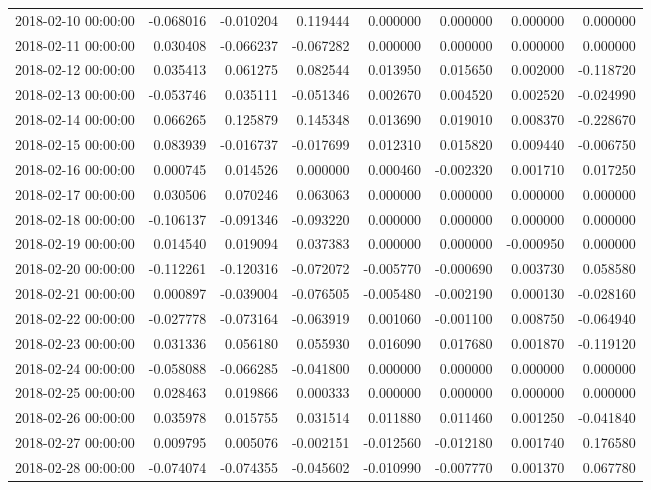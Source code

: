 \begin{tabular}{lrrrrrrr}
2018-02-10 00:00:00 & -0.068016 & -0.010204 & 0.119444 & 0.000000 & 0.000000 & 0.000000 & 0.000000 \\
2018-02-11 00:00:00 & 0.030408 & -0.066237 & -0.067282 & 0.000000 & 0.000000 & 0.000000 & 0.000000 \\
2018-02-12 00:00:00 & 0.035413 & 0.061275 & 0.082544 & 0.013950 & 0.015650 & 0.002000 & -0.118720 \\
2018-02-13 00:00:00 & -0.053746 & 0.035111 & -0.051346 & 0.002670 & 0.004520 & 0.002520 & -0.024990 \\
2018-02-14 00:00:00 & 0.066265 & 0.125879 & 0.145348 & 0.013690 & 0.019010 & 0.008370 & -0.228670 \\
2018-02-15 00:00:00 & 0.083939 & -0.016737 & -0.017699 & 0.012310 & 0.015820 & 0.009440 & -0.006750 \\
2018-02-16 00:00:00 & 0.000745 & 0.014526 & 0.000000 & 0.000460 & -0.002320 & 0.001710 & 0.017250 \\
2018-02-17 00:00:00 & 0.030506 & 0.070246 & 0.063063 & 0.000000 & 0.000000 & 0.000000 & 0.000000 \\
2018-02-18 00:00:00 & -0.106137 & -0.091346 & -0.093220 & 0.000000 & 0.000000 & 0.000000 & 0.000000 \\
2018-02-19 00:00:00 & 0.014540 & 0.019094 & 0.037383 & 0.000000 & 0.000000 & -0.000950 & 0.000000 \\
2018-02-20 00:00:00 & -0.112261 & -0.120316 & -0.072072 & -0.005770 & -0.000690 & 0.003730 & 0.058580 \\
2018-02-21 00:00:00 & 0.000897 & -0.039004 & -0.076505 & -0.005480 & -0.002190 & 0.000130 & -0.028160 \\
2018-02-22 00:00:00 & -0.027778 & -0.073164 & -0.063919 & 0.001060 & -0.001100 & 0.008750 & -0.064940 \\
2018-02-23 00:00:00 & 0.031336 & 0.056180 & 0.055930 & 0.016090 & 0.017680 & 0.001870 & -0.119120 \\
2018-02-24 00:00:00 & -0.058088 & -0.066285 & -0.041800 & 0.000000 & 0.000000 & 0.000000 & 0.000000 \\
2018-02-25 00:00:00 & 0.028463 & 0.019866 & 0.000333 & 0.000000 & 0.000000 & 0.000000 & 0.000000 \\
2018-02-26 00:00:00 & 0.035978 & 0.015755 & 0.031514 & 0.011880 & 0.011460 & 0.001250 & -0.041840 \\
2018-02-27 00:00:00 & 0.009795 & 0.005076 & -0.002151 & -0.012560 & -0.012180 & 0.001740 & 0.176580 \\
2018-02-28 00:00:00 & -0.074074 & -0.074355 & -0.045602 & -0.010990 & -0.007770 & 0.001370 & 0.067780 \\

\end{tabular}
